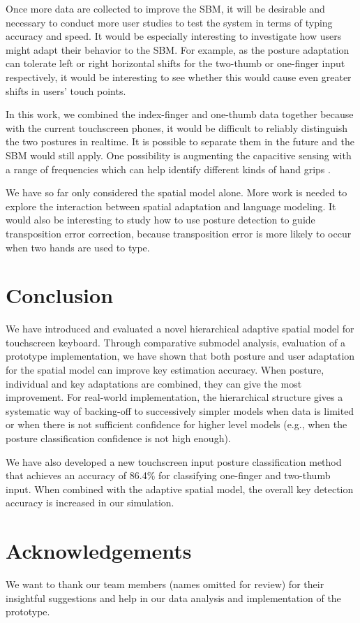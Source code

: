 \documentclass{sigchi}
\begin{document}
Once more data are collected to improve the SBM, it will be desirable and
necessary to conduct more user studies to test the system in terms of typing
accuracy and speed. It would be especially interesting to investigate how users
might adapt their behavior to the SBM. For example, as the posture adaptation
can tolerate left or right horizontal shifts for the two-thumb or one-finger
input respectively, it would be interesting to see whether this would cause even
greater shifts in users' touch points.

In this work, we combined the index-finger and one-thumb data together because 
with the current touchscreen phones, it would be difficult to reliably 
distinguish the two postures in realtime. It is possible to separate them in the
future and the SBM would still apply. One possibility is augmenting the
capacitive sensing with a range of frequencies which can help identify different kinds of 
hand grips \cite{Sato:2012}.

We have so far only considered the spatial model alone. More work is needed
to explore the interaction between spatial adaptation and language modeling. It would also be interesting to study how
to use posture detection to guide transposition error correction, because transposition error
is more likely to occur when two hands are used to type.

\section{Conclusion}
We have introduced and evaluated a novel hierarchical adaptive spatial model for
touchscreen keyboard. Through comparative submodel analysis,  evaluation of a prototype implementation, we have shown that both posture and user adaptation for the spatial model can improve key estimation accuracy. When posture, individual and key adaptations are combined, they can
give the most improvement. For real-world
implementation, the
hierarchical structure gives a systematic way of backing-off to successively simpler models  when data is limited
or when there is not sufficient confidence for higher level models (e.g., when the posture classification confidence is not 
high enough).

We have also developed a new touchscreen input posture classification method
that achieves an accuracy of 86.4\% for classifying one-finger and two-thumb input. When
combined with the adaptive spatial model, the overall key detection accuracy is increased
in our simulation.

\section{Acknowledgements}
We want to thank our team members (names omitted for review) for their insightful
suggestions and help in  our data analysis and implementation of the prototype.
\balance
\small


\end{document}
